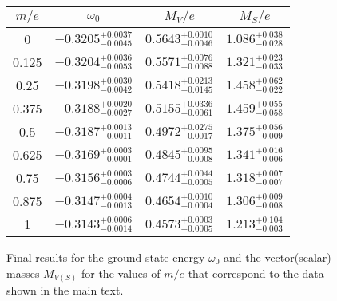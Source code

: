 \documentclass[aps,prl,reprint,twocolumn,superscriptaddress,floatfix,nofootinbib]{revtex4-1}
\begin{document}
\begin{figure}
	\centering
	\begin{tabular}{c || c | c | c}
		$m/e$ & $\omega_0$ & $M_V/e$ & $M_S/e$\\
		\hline \hline
		0 & $-0.3205_{-0.0045}^{+0.0037}$& $0.5643_{-0.0046}^{+0.0010}$ & $1.086_{-0.028}^{+0.038}$ \\
		\hline
		0.125 & $-0.3204_{-0.0053}^{+0.0036}$ & $0.5571_{-0.0088}^{+0.0076}$ & $1.321_{-0.033}^{ +0.023}$\\
		\hline
		0.25 & $-0.3198_{-0.0042}^{+0.0030}$ & $0.5418_{-0.0145}^{+0.0213}$ & $1.458_{-0.022}^{+0.062}$ \\
		\hline
		0.375 & $-0.3188_{-0.0027}^{+0.0020}$ & $0.5155_{-0.0061}^{+0.0336}$ & $1.459_{-0.058}^{ +0.055}$ \\
		\hline
		0.5 & $-0.3187_{-0.0011}^{+0.0013}$ & $0.4972_{-0.0017}^{+0.0275}$ & $1.375_{-0.009}^{+0.056}$ \\
		\hline
		0.625 & $-0.3169_{-0.0001}^{+0.0003}$ & $0.4845_{-0.0008}^{+0.0095}$ & $1.341_{-0.006}^{+0.016}$ \\
		\hline
		0.75 & $-0.3156_{-0.0006}^{+0.0003}$ & $0.4744_{-0.0005}^{+0.0044}$ & $1.318_{-0.007}^{+0.007}$ \\
		\hline
		0.875& $-0.3147_{-0.0013}^{+0.0004}$ & $0.4654_{-0.0004}^{+0.0010}$
		& $1.306_{-0.008}^{+0.009}$ \\
		\hline
		1& $-0.3143_{-0.0014}^{+0.0006}$ & $0.4573_{-0.0005}^{+0.0003}$ & $1.213_{-0.003}^{+0.104}$  
	\end{tabular}
	\caption{\label{table:results}Final results for the ground state energy $\omega_0$ and the vector(scalar) masses $M_{V(S)}$ for the values of $m/e$ that correspond to the data shown in the main text.}
\end{figure}


\end{document}
